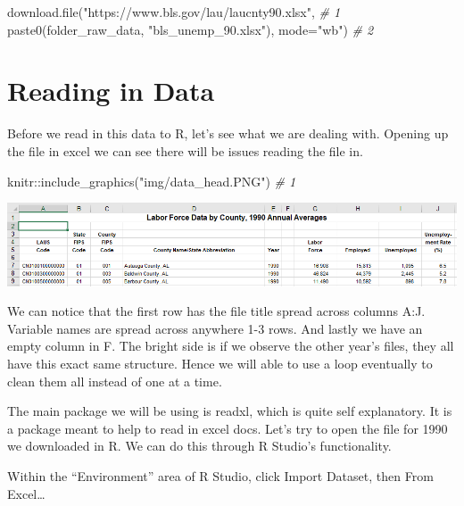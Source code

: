 \documentclass[
]{book}
\newenvironment{Shaded}{\begin{snugshade}}{\end{snugshade}}
\newcommand{\AttributeTok}[1]{\textcolor[rgb]{0.77,0.63,0.00}{#1}}
\newcommand{\CommentTok}[1]{\textcolor[rgb]{0.56,0.35,0.01}{\textit{#1}}}
\newcommand{\FunctionTok}[1]{\textcolor[rgb]{0.00,0.00,0.00}{#1}}
\newcommand{\NormalTok}[1]{#1}
\newcommand{\SpecialCharTok}[1]{\textcolor[rgb]{0.00,0.00,0.00}{#1}}
\newcommand{\StringTok}[1]{\textcolor[rgb]{0.31,0.60,0.02}{#1}}
\begin{document}
\begin{Shaded}
\begin{Highlighting}[]
\FunctionTok{download.file}\NormalTok{(}\StringTok{"https://www.bls.gov/lau/laucnty90.xlsx"}\NormalTok{,     }\CommentTok{\# 1}
  \FunctionTok{paste0}\NormalTok{(folder\_raw\_data, }\StringTok{"bls\_unemp\_90.xlsx"}\NormalTok{), }\AttributeTok{mode=}\StringTok{"wb"}\NormalTok{)  }\CommentTok{\# 2}
\end{Highlighting}
\end{Shaded}

\hypertarget{reading-in-data}{%
\section{Reading in Data}\label{reading-in-data}}

Before we read in this data to R, let's see what we are dealing with. Opening up the file in excel we can see there will be issues reading the file in.

\begin{Shaded}
\begin{Highlighting}[]
\NormalTok{knitr}\SpecialCharTok{::}\FunctionTok{include\_graphics}\NormalTok{(}\StringTok{"img/data\_head.PNG"}\NormalTok{)  }\CommentTok{\# 1}
\end{Highlighting}
\end{Shaded}

\includegraphics[width=13.61in]{img/data_head}

We can notice that the first row has the file title spread across columns A:J. Variable names are spread across anywhere 1-3 rows. And lastly we have an empty column in F. The bright side is if we observe the other year's files, they all have this exact same structure. Hence we will able to use a loop eventually to clean them all instead of one at a time.

The main package we will be using is readxl, which is quite self explanatory. It is a package meant to help to read in excel docs. Let's try to open the file for 1990 we downloaded in R. We can do this through R Studio's functionality.

Within the ``Environment'' area of R Studio, click Import Dataset, then From Excel\ldots{}
\end{document}
